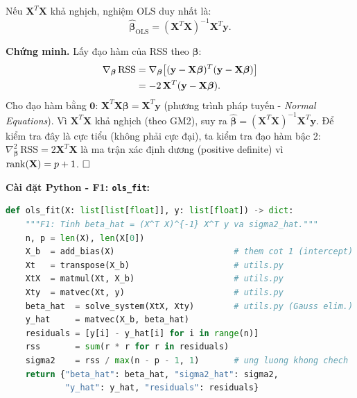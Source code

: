 \begin{tcolorbox}[mycodebox, colback=blue!3!white, colframe=blue!40!black,
    title={\textbf{Định lý 1.1} - Nghiệm OLS (Normal Equations)}]
Nếu $\mathbf{X}^T\mathbf{X}$ khả nghịch, nghiệm OLS duy nhất là:
\begin{equation}
    \hat{\boldsymbol{\beta}}_{\mathrm{OLS}}
    = (\mathbf{X}^T\mathbf{X})^{-1}\mathbf{X}^T\mathbf{y}.
    \label{eq:ols_solution}
\end{equation}
\end{tcolorbox}

\textbf{Chứng minh.} Lấy đạo hàm của RSS theo $\boldsymbol{\beta}$:
\begin{align}
    \nabla_{\boldsymbol{\beta}}\,\mathrm{RSS}
    &= \nabla_{\boldsymbol{\beta}}
       \bigl[(\mathbf{y} - \mathbf{X}\boldsymbol{\beta})^T
             (\mathbf{y} - \mathbf{X}\boldsymbol{\beta})\bigr] \notag \\
    &= -2\,\mathbf{X}^T(\mathbf{y} - \mathbf{X}\boldsymbol{\beta}).
\end{align}
Cho đạo hàm bằng $\mathbf{0}$:
$\mathbf{X}^T\mathbf{X}\boldsymbol{\beta} = \mathbf{X}^T\mathbf{y}$
(phương trình pháp tuyến - \emph{Normal Equations}).
Vì $\mathbf{X}^T\mathbf{X}$ khả nghịch (theo GM2), suy ra
$\hat{\boldsymbol{\beta}} = (\mathbf{X}^T\mathbf{X})^{-1}\mathbf{X}^T\mathbf{y}$.
Để kiểm tra đây là cực tiểu (không phải cực đại), ta kiểm tra đạo hàm bậc 2:
$\nabla^2_{\boldsymbol{\beta}}\,\mathrm{RSS} = 2\mathbf{X}^T\mathbf{X}$
là ma trận xác định dương (positive definite) vì $\operatorname{rank}(\mathbf{X}) = p+1$.
$\hfill\square$

\textbf{Cài đặt Python - F1: \texttt{ols\_fit}:}

\begin{lstlisting}[language=Python, caption={Hàm \texttt{ols\_fit} - tính nghiệm OLS từ công thức Normal Equations}]
def ols_fit(X: list[list[float]], y: list[float]) -> dict:
    """F1: Tinh beta_hat = (X^T X)^{-1} X^T y va sigma2_hat."""
    n, p = len(X), len(X[0])
    X_b  = add_bias(X)                        # them cot 1 (intercept)
    Xt   = transpose(X_b)                     # utils.py
    XtX  = matmul(Xt, X_b)                    # utils.py
    Xty  = matvec(Xt, y)                      # utils.py
    beta_hat  = solve_system(XtX, Xty)        # utils.py (Gauss elim.)
    y_hat     = matvec(X_b, beta_hat)
    residuals = [y[i] - y_hat[i] for i in range(n)]
    rss       = sum(r * r for r in residuals)
    sigma2    = rss / max(n - p - 1, 1)       # ung luong khong chech
    return {"beta_hat": beta_hat, "sigma2_hat": sigma2,
            "y_hat": y_hat, "residuals": residuals}
\end{lstlisting}

